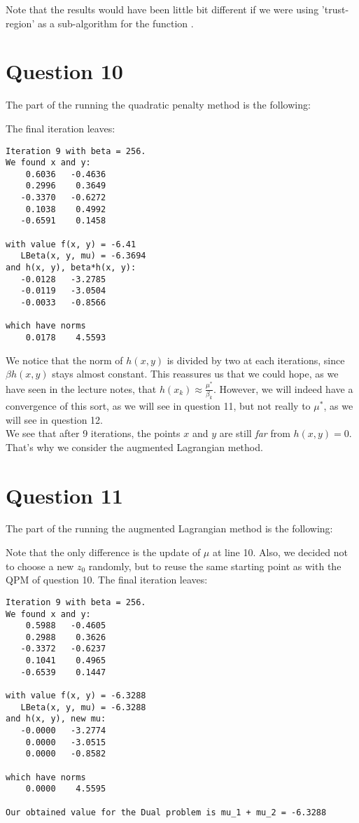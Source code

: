 \documentclass{article}
\begin{document}
Note that the results would have been little bit different if we were using 'trust-region' as a sub-algorithm for the function .


\section*{Question 10}
The part of the  running the quadratic penalty method is the following:


The final iteration leaves:
\begin{lstlisting}
Iteration 9 with beta = 256.
We found x and y:
    0.6036   -0.4636
    0.2996    0.3649
   -0.3370   -0.6272
    0.1038    0.4992
   -0.6591    0.1458

with value f(x, y) = -6.41
   LBeta(x, y, mu) = -6.3694
and h(x, y), beta*h(x, y):
   -0.0128   -3.2785
   -0.0119   -3.0504
   -0.0033   -0.8566

which have norms
    0.0178    4.5593
\end{lstlisting}

We notice that the norm of $h(x, y)$ is divided by two at each iterations, since $\beta h(x, y)$ stays almost constant.
This reassures us that we could hope, as we have seen in the lecture notes, that $h(x_k) \approx \frac{\mu^*}{\beta_k}$. However, we will indeed have a convergence of this sort, as we will see in question 11, but not really to $\mu^*$, as we will see in question 12.\\
We see that after 9 iterations, the points $x$ and $y$ are still \textit{far} from $h(x, y) = 0$. That's why we consider the augmented Lagrangian method.


\section*{Question 11}
The part of the  running the augmented Lagrangian method is the following:


Note that the only difference is the update of $\mu$ at line 10. Also, we decided not to choose a new $z_0$ randomly, but to reuse the same starting point as with the QPM of question 10.
The final iteration leaves:
\begin{lstlisting}
Iteration 9 with beta = 256.
We found x and y:
    0.5988   -0.4605
    0.2988    0.3626
   -0.3372   -0.6237
    0.1041    0.4965
   -0.6539    0.1447

with value f(x, y) = -6.3288
   LBeta(x, y, mu) = -6.3288
and h(x, y), new mu:
   -0.0000   -3.2774
    0.0000   -3.0515
    0.0000   -0.8582

which have norms
    0.0000    4.5595

Our obtained value for the Dual problem is mu_1 + mu_2 = -6.3288
\end{lstlisting}
\end{document}
